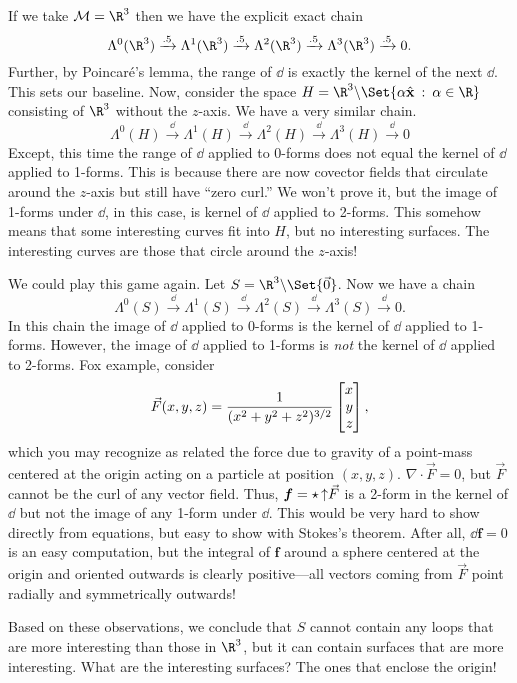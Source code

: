 If we take $\mathcal M=\R^3$ then we have the explicit exact chain
\[
	\Lambda^0(\R^3) \xrightarrow{\dd}
	\Lambda^1(\R^3)\xrightarrow{\dd} 
	\Lambda^{2}(\R^3)\xrightarrow{\dd}  
	\Lambda^{3}(\R^3)\xrightarrow{\dd}  0.
\]
Further, by Poincar\'e's lemma, the range of $\dd$ is exactly the kernel of the next $\dd$.
This sets our baseline.  Now, consider the space $H=\R^3\backslash\Set{\alpha\xhat\given\alpha\in\R}$
consisting of $\R^3$ without the $z$-axis.  We have a very similar chain.
\[
	\Lambda^0  (H) \xrightarrow{\dd}
	\Lambda^1  (H)\xrightarrow{\dd} 
	\Lambda^{2}(H)\xrightarrow{\dd}  
	\Lambda^{3}(H)\xrightarrow{\dd}  0
\]
Except, this time the range of $\dd$ applied to 0-forms does not equal the kernel
of $\dd$ applied to 1-forms.  This is because there are now covector fields
that circulate around the $z$-axis but still have ``zero curl.''  We won't prove it, but
the image of 1-forms under $\dd$, in this case, is kernel of $\dd$ applied to 2-forms.
This somehow means that some interesting curves fit into $H$, but no interesting surfaces.
The interesting curves are those that circle around the $z$-axis!

We could play this game again.  Let $S=\R^3\backslash\Set{\vec 0}$.  Now we have
a chain
\[
	\Lambda^0  (S) \xrightarrow{\dd}
	\Lambda^1  (S)\xrightarrow{\dd} 
	\Lambda^{2}(S)\xrightarrow{\dd}  
	\Lambda^{3}(S)\xrightarrow{\dd}  0.
\]
In this chain the image of $\dd$ applied to 0-forms is the kernel of $\dd$ applied to 1-forms.
However, the image of $\dd$ applied to 1-forms is \emph{not} the kernel of $\dd$ applied to
2-forms.  Fox example, consider
\[
	\vec F(x,y,z) = \frac{1}{(x^2+y^2+z^2)^{3/2}}\mat{x\\y\\z},
\]
which you may recognize as related the force due to gravity of a point-mass centered
at the origin acting on a particle at position $(x,y,z)$.  $\nabla \cdot \vec F=0$,
but $\vec F$ cannot be the curl of any vector field. Thus, $\bm f=\star \operatorname{\uparrow\!}\vec F$ is a
2-form in the kernel of $\dd$ but not the image of any 1-form under $\dd$.  This would be very
hard to show directly from equations, but easy to show with Stokes's theorem.  After all,
$\dd \bm f=0$ is an easy computation,
but the integral of $\bm f$ around a sphere centered at
the origin and oriented outwards is clearly positive---all vectors coming from $\vec F$ point
radially and symmetrically outwards!

Based on these observations,
we conclude that $S$ cannot contain any loops that are more interesting than those in $\R^3$, but
it can contain surfaces that are more interesting.  What are the interesting surfaces?  The ones
that enclose the origin!
